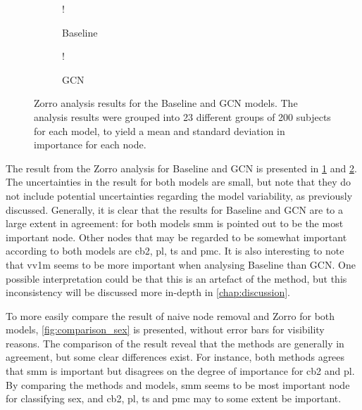\begin{figure}[!htbp]
    \centering
        \begin{subfigure}{.5\textwidth}
            \centering
            \begin{center}
                \resizebox {1.0\linewidth} {!} {
                    
                }
            \end{center}
            \caption{Baseline}
            \label{fig:zorro_sex_baseline}
        \end{subfigure}%
        \begin{subfigure}{.5\textwidth}
            \centering
            \begin{center}
                \resizebox {1.0\linewidth} {!} {
                    
                }
            \end{center}
            \caption{GCN}
            \label{fig:zorro_sex_gcn}
        \end{subfigure}
    \caption{Zorro analysis results for the Baseline and GCN models. The analysis results were grouped into 23 different groups of 200 subjects for each model, to yield a mean and standard deviation in importance for each node.}
    \label{fig:zorro_sex}
\end{figure}

The result from the Zorro analysis for Baseline and GCN is presented in \cref{fig:zorro_sex_baseline} and \cref{fig:zorro_sex_gcn}. The uncertainties in the result for both models are small, but note that they do not include potential uncertainties regarding the model variability, as previously discussed. Generally, it is clear that the results for Baseline and GCN are to a large extent in agreement: for both models \acrshort{smm} is pointed out to be the most important node. Other nodes that may be regarded to be somewhat important according to both models are \acrshort{cb2}, \acrshort{pl}, \acrshort{ts} and \acrshort{pmc}. It is also interesting to note that \acrshort{vv1m} seems to be more important when analysing Baseline than GCN. One possible interpretation could be that this is an artefact of the method, but this inconsistency will be discussed more in-depth in \cref{chap:discussion}.

To more easily compare the result of naive node removal and Zorro for both models, \cref{fig:comparison_sex} is presented, without error bars for visibility reasons. The comparison of the result reveal that the methods are generally in agreement, but some clear differences exist. For instance, both methods agrees that \acrshort{smm} is important but disagrees on the degree of importance for \acrshort{cb2} and \acrshort{pl}. By comparing the methods and models, \acrshort{smm} seems to be most important node for classifying sex, and \acrshort{cb2}, \acrshort{pl}, \acrshort{ts} and \acrshort{pmc} may to some extent be important.

